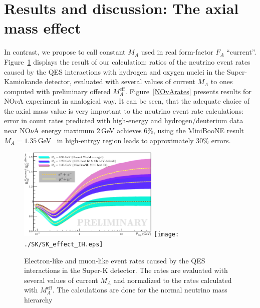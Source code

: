 \section{Results and discussion: The axial mass effect}
In contrast, we propose to call constant $M_{A}$ used in real form-factor $F_{A}$ ``current''. Figure~\ref{SKrates} displays the result of our calculation: ratios of the neutrino event rates caused by the QES interactions with hydrogen and oxygen nuclei in the Super-Kamiokande detector, evaluated with several values of current $M_{A}$ to ones computed with preliminary offered $M_{A}^{\mathrm{eff}}$. Figure~\ref{NOvArates} presents results for NO$\nu$A experiment in analogical way. It can be seen, that the adequate choice of the axial mass value is very important to the neutrino event rate calculations: error in count rates predicted with high-energy and hydrogen/deuterium data near NO$\nu$A energy maximum 2\,GeV achieves 6\%, using the MiniBooNE result $M_{A}=1.35$\,GeV~\cite{AguilarArevalo:2010zc} in high-entrgy region leads to approximately 30\% errors.

\begin{figure}[h!]
\begin{center}
\includegraphics[width=0.6\textwidth]{./SK/cvsv2lmn_all2.eps}
\texttt{[image: ./SK/SK\_effect\_IH.eps]}
\caption{\label{SKrates}Electron-like and muon-like event rates caused by the QES interactions in the Super-K detector. The rates are evaluated with several values of current $M_{A}$ and normalized to the rates calculated with $M_{A}^{\mathrm{eff}}$. The calculations are done for the normal neutrino mass hierarchy}
\end{center}
\end{figure}

